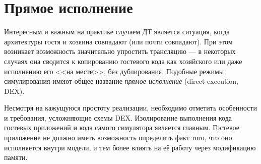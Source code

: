 \section{Прямое исполнение}\label{sec:dex}

Интересным и важным на практике случаем ДТ является ситуация, когда архитектуры гостя и хозяина совпадают (или почти совпадают). При этом возникает возможность значительно упростить трансляцию --- в некоторых случаях она сводится к копированию гостевого кода как хозяйского или даже исполнению его <<на месте>>, без дублирования. Подобные режимы симулирования имеют общее название \textit{прямое исполнение} (\abbr direct execution, DEX). 

Несмотря на кажущуюся простоту реализации, необходимо отметить особенности и требования, усложняющие схемы DEX. Изолирование выполнения кода гостевых приложений и кода самого симулятора является главным. Гостевое приложение не должно иметь возможность определить факт того, что оно исполняется внутри модели, и тем более влиять на её работу через модификацию памяти. 

